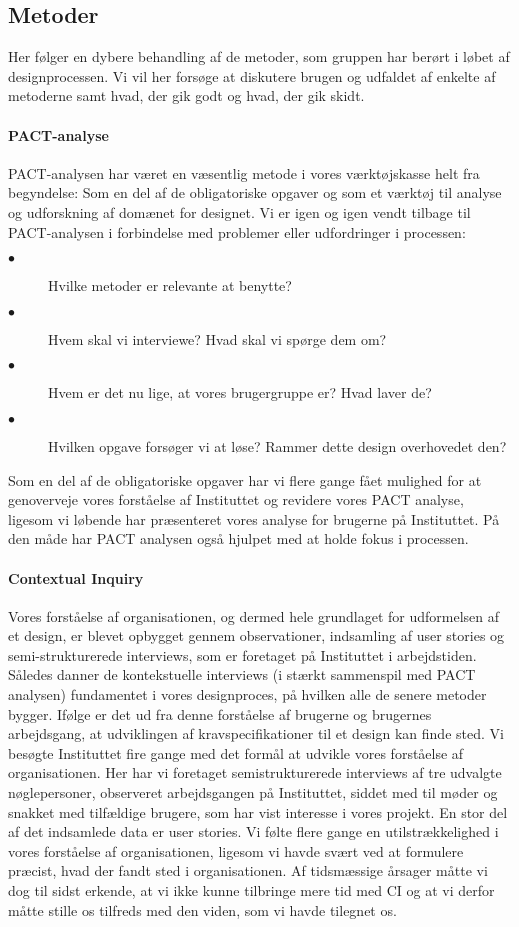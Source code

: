 \subsection{Metoder}
Her følger en dybere behandling af de metoder, som gruppen har berørt i løbet af designprocessen. Vi vil her forsøge at diskutere brugen og udfaldet af enkelte af metoderne samt hvad, der gik godt og hvad, der gik skidt.

\paragraph{PACT-analyse}
PACT-analysen har været en væsentlig metode i vores værktøjskasse helt fra begyndelse: Som en del af de obligatoriske opgaver og som et værktøj til analyse og udforskning af domænet for designet.
Vi er igen og igen vendt tilbage til PACT-analysen i forbindelse med problemer eller udfordringer i processen: 
\begin{description}
\item[$\bullet$] Hvilke metoder er relevante at benytte?
\item[$\bullet$] Hvem skal vi interviewe? Hvad skal vi spørge dem om?
\item[$\bullet$] Hvem er det nu lige, at vores brugergruppe er? Hvad laver de?
\item[$\bullet$] Hvilken opgave forsøger vi at løse? Rammer dette design overhovedet den?
\end{description}
Som en del af de obligatoriske opgaver har vi flere gange fået mulighed for at genoverveje vores forståelse af Instituttet og revidere vores PACT analyse, ligesom vi løbende har præsenteret vores analyse for brugerne på Instituttet. På den måde har PACT analysen også hjulpet med at holde fokus i processen.

\paragraph{Contextual Inquiry}
Vores forståelse af organisationen, og dermed hele grundlaget for udformelsen af et design, er blevet opbygget gennem observationer, indsamling af user stories og semi-strukturerede interviews, som er foretaget på Instituttet i arbejdstiden. 
Således danner de kontekstuelle interviews (i stærkt sammenspil med PACT analysen) fundamentet i vores designproces, på hvilken alle de senere metoder bygger. Ifølge \citep{Benyon} er det ud fra denne forståelse af brugerne og brugernes arbejdsgang, at udviklingen af kravspecifikationer til et design kan finde sted.
Vi besøgte Instituttet fire gange med det formål at udvikle vores forståelse af organisationen. Her har vi foretaget semistrukturerede interviews af tre udvalgte nøglepersoner, observeret arbejdsgangen på Instituttet, siddet med til møder og snakket med tilfældige brugere, som har vist interesse i vores projekt. En stor del af det indsamlede data er user stories.
Vi følte flere gange en utilstrækkelighed i vores forståelse af organisationen, ligesom vi havde svært ved at formulere præcist, hvad der fandt sted i organisationen. Af tidsmæssige årsager måtte vi dog til sidst erkende, at vi ikke kunne tilbringe mere tid med CI og at vi derfor måtte stille os tilfreds med den viden, som vi havde tilegnet os. 

